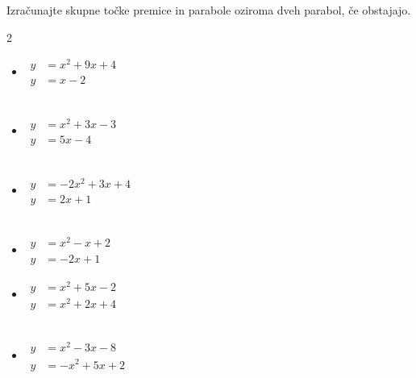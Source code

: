         \begin{naloga}
            Izračunajte skupne točke premice in parabole oziroma dveh parabol, če obstajajo.
            
            \begin{multicols}{2}
                
                \begin{itemize}
                    \item $ \begin{aligned}
                        y&=x^2+9x+4 \\ y&=x-2
                    \end{aligned} $ \\~

                    \item $ \begin{aligned}
                        y&=x^2+3x-3 \\ y&=5x-4
                    \end{aligned} $ \\~

                    \item $ \begin{aligned}
                        y&=-2x^2+3x+4 \\ y&=2x+1
                    \end{aligned} $ \\~

                    \item $ \begin{aligned}
                        y&=x^2-x+2 \\ y&=-2x+1
                    \end{aligned} $
                \end{itemize}


                \begin{itemize}
                    \item $ \begin{aligned}
                        y&=x^2+5x-2 \\ y&=x^2+2x+4
                    \end{aligned} $ \\~

                    \item $ \begin{aligned}
                        y&=x^2-3x-8 \\ y&=-x^2+5x+2
                    \end{aligned} $ \\~


\end{itemize}
\end{multicols}
\end{naloga}
